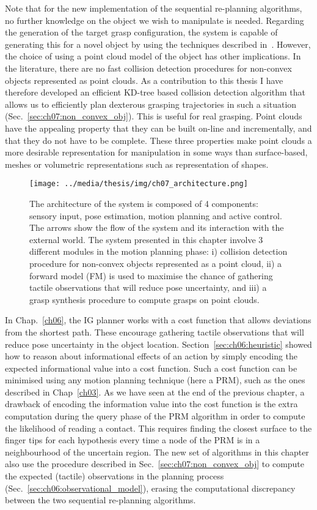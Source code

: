 Note that for the new implementation of the sequential re-planning algorithms, no further knowledge on the object we wish to manipulate is needed. Regarding the generation of the target grasp configuration, the system is capable of generating this for a novel object by using the techniques described in~\citep{bib:kopicki_2014}. However, the choice of using a point cloud model of the object has other implications. In the literature, there are no fast collision detection procedures for non-convex objects represented as point clouds. As a contribution to this thesis I have therefore developed an efficient KD-tree based collision detection algorithm that allows us to efficiently plan dexterous grasping trajectories in such a situation (Sec.~\ref{sec:ch07:non_convex_obj}). This is useful for real grasping. Point clouds have the appealing property that they can be built on-line and incrementally, and that they do not have to be complete. These three properties make point clouds a more desirable representation for manipulation in some ways than surface-based, meshes or volumetric representations such as representation of shapes. 

\begin{figure}[t]
\centerline{
\texttt{[image: ../media/thesis/img/ch07\_architecture.png]}
}
\caption[SPAM-PLAN for grasping]{The architecture of the system is composed of 4 components: sensory input, pose estimation, motion planning and active control. The arrows show the flow of the system and its interaction with the external world. The system presented in this chapter involve 3 different modules in the motion planning phase: i) collision detection procedure for non-convex objects represented as a point cloud, ii) a forward model (FM) is used to maximise the chance of gathering tactile observations that will reduce pose uncertainty, and iii) a grasp synthesis procedure to compute grasps on point clouds. }
\label{fig:architecture}
\end{figure}

In Chap.~\ref{ch06}, the IG planner works with a cost function that allows deviations from the shortest path. These encourage gathering tactile observations that will reduce pose uncertainty in the object location. Section~\ref{sec:ch06:heuristic} showed how to reason about informational effects of an action by simply encoding the expected informational value into a cost function. Such a cost function can be minimised using any motion planning technique (here a PRM), such as the ones described in Chap~\ref{ch03}. As we have seen at the end of the previous chapter, a drawback of encoding the information value into the cost function is the extra computation during the query phase of the PRM algorithm in order to compute the likelihood of reading a contact. This requires finding the closest surface to the finger tips for each hypothesis every time a node of the PRM is in a neighbourhood of the uncertain region.
The new set of algorithms in this chapter also use the procedure described in Sec.~\ref{sec:ch07:non_convex_obj} to compute the expected (tactile) observations in the planning process (Sec.~\ref{sec:ch06:observational_model}), erasing the computational discrepancy between the two sequential re-planning algorithms. 

